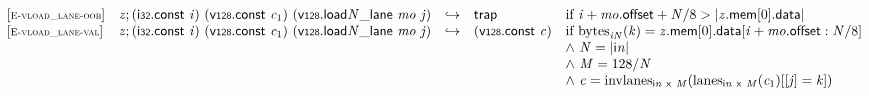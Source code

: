 \vspace{1ex}

$$
\begin{array}{@{}l@{}lcl@{}l@{}}
{[\textsc{\scriptsize E{-}vload\_lane{-}oob}]} \quad & {\mathit{z}} ; (\mathsf{i{\scriptstyle32}}.\mathsf{const}~{\mathit{i}})~(\mathsf{v{\scriptstyle128}}.\mathsf{const}~{\mathit{c}}_{{1}})~({{{\mathsf{v{\scriptstyle128}.load}}{{\mathit{N}}}}{\mathsf{\_}}}{\mathsf{lane}}~{\mathit{mo}}~{\mathit{j}}) &\hookrightarrow& \mathsf{trap} &\quad
  \mbox{if}~{\mathit{i}} + {\mathit{mo}}.\mathsf{offset} + {\mathit{N}} / 8 > {|{{\mathit{z}}.\mathsf{mem}}{{}[0]}.\mathsf{data}|} \\
{[\textsc{\scriptsize E{-}vload\_lane{-}val}]} \quad & {\mathit{z}} ; (\mathsf{i{\scriptstyle32}}.\mathsf{const}~{\mathit{i}})~(\mathsf{v{\scriptstyle128}}.\mathsf{const}~{\mathit{c}}_{{1}})~({{{\mathsf{v{\scriptstyle128}.load}}{{\mathit{N}}}}{\mathsf{\_}}}{\mathsf{lane}}~{\mathit{mo}}~{\mathit{j}}) &\hookrightarrow& (\mathsf{v{\scriptstyle128}}.\mathsf{const}~{\mathit{c}}) &\quad
  \mbox{if}~{{\mathrm{bytes}}}_{{{\mathit{i}}}{{\mathit{N}}}}({\mathit{k}}) = {{\mathit{z}}.\mathsf{mem}}{{}[0]}.\mathsf{data}{}[{\mathit{i}} + {\mathit{mo}}.\mathsf{offset} : {\mathit{N}} / 8] \\
 &&&&\quad {\land}~{\mathit{N}} = {|{\mathsf{i}}{{\mathit{n}}}|} \\
 &&&&\quad {\land}~{\mathit{M}} = 128 / {\mathit{N}} \\
 &&&&\quad {\land}~{\mathit{c}} = {{\mathrm{invlanes}}}_{{\mathsf{i}}{{\mathit{n}}}~\mathsf{x}~{\mathit{M}}}({{\mathrm{lanes}}}_{{\mathsf{i}}{{\mathit{n}}}~\mathsf{x}~{\mathit{M}}}({\mathit{c}}_{{1}}){}[{}[{\mathit{j}}] = {\mathit{k}}]) \\
\end{array}
$$

\vspace{1ex}

